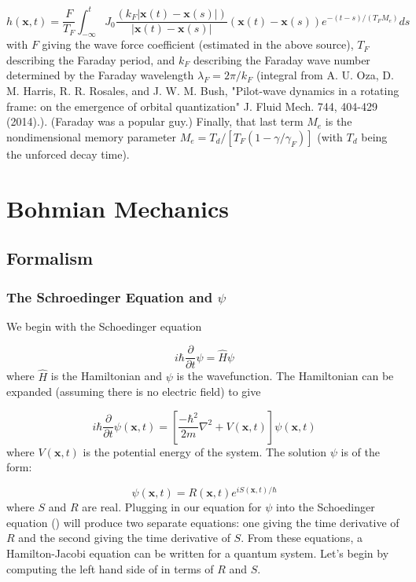 \begin{equation}
h(\textbf{x},t) = \frac{F}{T_F} \int_{-\infty}^{t} J_0 \frac{(k_F |\textbf{x}(t)-\textbf{x}(s)|)}{|\textbf{x}(t)-\textbf{x}(s)|} (\textbf{x}(t)-\textbf{x}(s))e^{-(t-s)/(T_F M_e)} ds
\end{equation}
with $F$ giving the wave force coefficient (estimated in the above source), $T_F$ describing the Faraday period, and $k_F$ describing the Faraday wave number determined by the Faraday wavelength $\lambda_F = 2π/k_F$ (integral from A. U. Oza, D. M. Harris, R. R. Rosales, and J. W. M. Bush, "Pilot-wave dynamics in a rotating frame: on the emergence of orbital quantization" J. Fluid Mech. 744, 404-429 (2014).). (Faraday was a popular guy.) Finally, that last term $M_e$ is the nondimensional memory parameter $M_e = T_d/[T_F(1-\gamma / \gamma_F)]$ (with $T_d$ being the unforced decay time).


\section{Bohmian Mechanics}

\subsection{Formalism}
\subsubsection{The Schroedinger Equation and $\psi$}

We begin with the Schoedinger equation

\begin{equation}
i \hbar \frac{\partial}{\partial t}\psi = \hat H \psi
\end{equation}
where $\hat H$ is the Hamiltonian and $\psi$ is the wavefunction. The Hamiltonian can be expanded (assuming there is no electric field) to give

\begin{equation}
\label{SE}
i\hbar\frac{\partial}{\partial t} \psi(\mathbf{x},t) = \left [ \frac{-\hbar^2}{2 m}\nabla^2 + V(\mathbf{x},t)\right ] \psi(\mathbf{x},t)
\end{equation}
where $V(\mathbf{x},t)$ is the potential energy of the system. The solution $\psi$ is of the form:

\begin{equation}
\psi(\mathbf{x},t) = R(\mathbf{x},t) e^{i S(\mathbf{x},t) / \hbar}
\end{equation}
where $S$ and $R$ are real. Plugging in our equation for $\psi$ into the Schoedinger equation () will produce two separate equations: one giving the time derivative of $R$ and the second giving the time derivative of $S$. From these equations, a Hamilton-Jacobi equation can be written for a quantum system.
    Let's begin by computing the left hand side of  in terms of $R$ and $S$.   

